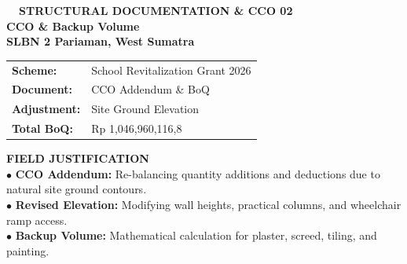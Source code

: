 \documentclass[10pt,a4paper,landscape]{article}
\begin{document}
\noindent
\begin{minipage}[t]{0.30\linewidth}
  \vspace{0pt}
  \begin{tcolorbox}[sharp corners, boxrule=0.8pt, colframe=pborder, colback=white, left=3mm, right=3mm, top=2.5mm, bottom=2.5mm, height=98mm]
    \colorbox{pred}{\fontsize{7pt}{8pt}\selectfont\bfseries\color{white}\ \ STRUCTURAL DOCUMENTATION \& CCO 02\ \ }\\[1.5mm]
    {\fontsize{9.5pt}{11.5pt}\selectfont\bfseries\color{pnavy}CCO \& Backup Volume}\\[0.5mm]
    {\fontsize{7pt}{8.5pt}\selectfont\bfseries\color{pred}SLBN 2 Pariaman, West Sumatra}\\[2mm]

    \begin{tcolorbox}[sharp corners, boxrule=0.5pt, colframe=pborder, colback=pbglight, left=2mm, right=2mm, top=1.5mm, bottom=1.5mm]
      \begin{tabularx}{\linewidth}{@{}p{22mm} X@{}}
        {\fontsize{6.8pt}{8pt}\selectfont\bfseries Scheme:} & {\fontsize{6.8pt}{8pt}\selectfont School Revitalization Grant 2026} \\[0.8mm]
        {\fontsize{6.8pt}{8pt}\selectfont\bfseries Document:} & {\fontsize{6.8pt}{8pt}\selectfont CCO Addendum \& BoQ} \\[0.8mm]
        {\fontsize{6.8pt}{8pt}\selectfont\bfseries Adjustment:} & {\fontsize{6.8pt}{8pt}\selectfont Site Ground Elevation} \\[0.8mm]
        {\fontsize{6.8pt}{8pt}\selectfont\bfseries Total BoQ:} & {\fontsize{6.8pt}{8pt}\selectfont Rp 1,046,960,116,8}
      \end{tabularx}
    \end{tcolorbox}
    \vspace{1.5mm}

    {\fontsize{7.5pt}{9pt}\selectfont\bfseries\color{pnavy}FIELD JUSTIFICATION}\\[0.8mm]
    {\fontsize{6.5pt}{8.2pt}\selectfont\color{psteel}
    $\bullet$ \textbf{CCO Addendum:} Re-balancing quantity additions and deductions due to natural site ground contours.\\
    $\bullet$ \textbf{Revised Elevation:} Modifying wall heights, practical columns, and wheelchair ramp access.\\
    $\bullet$ \textbf{Backup Volume:} Mathematical calculation for plaster, screed, tiling, and painting.
    }
  \end{tcolorbox}
  \vspace{2mm}


\end{minipage}
\end{document}
